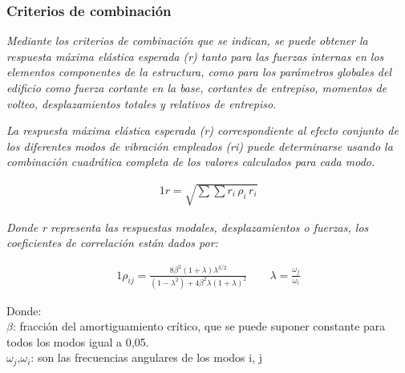 \documentclass{article}%
\begin{document}
\subsubsection{Criterios de combinación}%
\label{ssubsec:Criteriosdecombinacin}%
\begin{tcolorbox}[colback=gray!5!white,colframe=Maroon!75!black,fonttitle=\bfseries,title=Art. 29.3.1]%
\textit{Mediante los criterios de combinación que se indican, se puede obtener la respuesta máxima elástica esperada (r) tanto para las fuerzas internas en los elementos componentes de la estructura, como para los parámetros globales  del edificio como fuerza cortante en la base, cortantes de entrepiso, momentos  de volteo, desplazamientos totales y relativos de entrepiso.}%
\end{tcolorbox}%
\begin{tcolorbox}[colback=gray!5!white,colframe=Maroon!75!black,fonttitle=\bfseries,title=Art. 29.3.2]%
\textit{La respuesta máxima elástica esperada (r) correspondiente al efecto conjunto  de  los  diferentes  modos  de  vibración  empleados  (ri)  puede determinarse usando la combinación cuadrática completa de los valores calculados para cada modo.}%
\end{tcolorbox}%
\begin{alignat}{1}%
r=\sqrt{\sum \sum r_{i}\,\rho _{i}\,r_{i}}%
\end{alignat}%
\begin{tcolorbox}[colback=gray!5!white,colframe=Maroon!75!black,fonttitle=\bfseries,title=Art. 29.3.3]%
\textit{Donde r representa las respuestas modales, desplazamientos o fuerzas, los coeficientes de correlación están dados por:}%
\end{tcolorbox}%
\begin{alignat}{1}%
\rho_{ij}=\frac{8\beta ^{2}\left ( 1+\lambda  \right )\lambda ^{3/2}}{\left ( 1-\lambda ^{2} \right )+4\beta ^{2}\lambda \left ( 1+\lambda  \right )^{2}}\quad\quad  \lambda =\frac{\omega _{j}}{\omega _{i}}%
\end{alignat}%
\begin{flushleft}%
Donde:\\%
$\beta$: fracción del amortiguamiento crítico, que se puede suponer constante para todos los modos igual a 0,05.\\%
$\omega _{j}$,$\omega _{i}$: son las frecuencias angulares de los modos i, j\\%
\end{flushleft}

%
\end{document}

